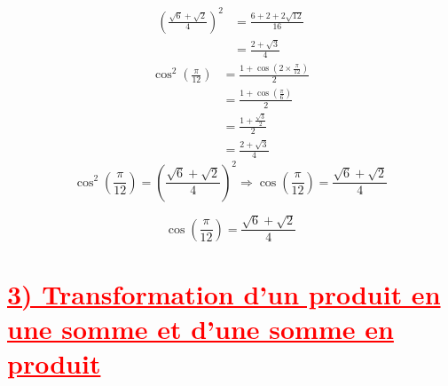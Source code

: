 \documentclass[a4paper,12pt]{article}
\begin{document}
\[
    \begin{aligned}
        \left(\frac{\sqrt{6} + \sqrt{2}}{4}\right)^2 & = \frac{6 + 2 + 2\sqrt{12}}{16} \\
                                                     & = \frac{2 + \sqrt{3}}{4}
    \end{aligned}
\]
\vspace{1cm}
\[
    \begin{aligned}
        \cos^2\left(\frac{\pi}{12}\right)
         & = \frac{1 + \cos\left(2 \times \frac{\pi}{12}\right)}{2} \\
         & = \frac{1 + \cos\left(\frac{\pi}{6}\right)}{2}           \\
         & = \frac{1 + \frac{\sqrt{3}}{2}}{2}                       \\
         & = \frac{2 + \sqrt{3}}{4}
    \end{aligned}
\]
\vspace{1cm}
\[
    \cos^2\left(\frac{\pi}{12}\right)
    = \left( \frac{\sqrt{6} + \sqrt{2}}{4} \right)^2
    \Rightarrow \cos\left(\frac{\pi}{12}\right) = \frac{\sqrt{6} + \sqrt{2}}{4}
\]

\[
    \boxed{ \cos\left( \frac{\pi}{12} \right) = \frac{\sqrt{6} + \sqrt{2}}{4} }
\]

\section*{\textcolor{red}{\underline{3) Transformation d’un produit en une somme et d'une somme en produit}}}
\end{document}
